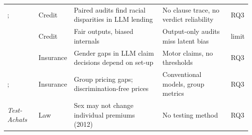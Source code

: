 {\begin{longtable}{@{}>{\raggedright\arraybackslash}p{2.6cm}>{\raggedright\arraybackslash}p{1.8cm}>{\raggedright\arraybackslash}p{4.3cm}>{\raggedright\arraybackslash}p{4.3cm}>{\raggedright\arraybackslash}p{1.3cm}@{}}
\citet{bowen}; \citet{cook2025} & Credit & Paired audits find racial disparities in LLM lending & No clause trace, no verdict reliability & RQ3 \\
\citet{tripathy2026} & Credit & Fair outputs, biased internals & Output-only audits miss latent bias & limit \\
\citet{huang2026binary} & Insurance & Gender gaps in LLM claim decisions depend on set-up & Motor claims, no thresholds & RQ3 \\
\citet{gupta2025}; \citet{lindholm2022} & Insurance & Group pricing gaps; discrimination-free prices & Conventional models, group metrics & RQ3 \\
\emph{Test-Achats} \citep{testachats} & Law & Sex may not change individual premiums (2012) & No testing method & RQ3 \\
\end{longtable}
}
